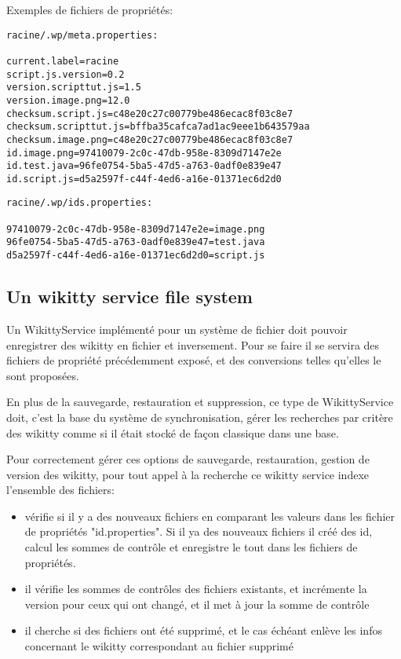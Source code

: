 Exemples de fichiers de propriétés:
\begin{verbatim}
racine/.wp/meta.properties:

current.label=racine
script.js.version=0.2
version.scripttut.js=1.5
version.image.png=12.0
checksum.script.js=c48e20c27c00779be486ecac8f03c8e7
checksum.scripttut.js=bffba35cafca7ad1ac9eee1b643579aa
checksum.image.png=c48e20c27c00779be486ecac8f03c8e7
id.image.png=97410079-2c0c-47db-958e-8309d7147e2e
id.test.java=96fe0754-5ba5-47d5-a763-0adf0e839e47
id.script.js=d5a2597f-c44f-4ed6-a16e-01371ec6d2d0
\end{verbatim}

\begin{verbatim}
racine/.wp/ids.properties:

97410079-2c0c-47db-958e-8309d7147e2e=image.png
96fe0754-5ba5-47d5-a763-0adf0e839e47=test.java
d5a2597f-c44f-4ed6-a16e-01371ec6d2d0=script.js
\end{verbatim}

\subsection{Un wikitty service file system}

Un WikittyService implémenté pour un système de fichier doit pouvoir enregistrer
des wikitty en fichier et inversement. Pour se faire il se servira des fichiers
de propriété précédemment exposé, et des conversions telles qu'elles le sont
proposées.

En plus de la sauvegarde, restauration et suppression, ce type de WikittyService
doit, c'est la base du système de synchronisation, gérer les recherches par
critère des wikitty comme si il était stocké de façon classique dans une base.

Pour correctement gérer ces options de sauvegarde, restauration, gestion de
version des wikitty, pour tout appel à la recherche ce wikitty service indexe
l'ensemble des fichiers:
\begin{itemize}
\item vérifie si il y a des nouveaux fichiers en comparant les valeurs dans les
fichier de propriétés "id.properties". Si il ya des nouveaux fichiers il créé
des id, calcul les sommes de contrôle et enregistre le tout dans les fichiers de
propriétés.
\item il vérifie les sommes de contrôles des fichiers existants, et incrémente la
version pour ceux qui ont changé, et il met à jour la somme de contrôle
\item il cherche si des fichiers ont été supprimé, et le cas échéant enlève les
infos concernant le wikitty correspondant au fichier supprimé
\end{itemize}

